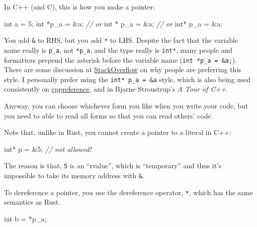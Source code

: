 \documentclass[
]{book}
\newenvironment{Shaded}{\begin{snugshade}}{\end{snugshade}}
\newcommand{\CommentTok}[1]{\textcolor[rgb]{0.56,0.35,0.01}{\textit{#1}}}
\newcommand{\DataTypeTok}[1]{\textcolor[rgb]{0.13,0.29,0.53}{#1}}
\newcommand{\DecValTok}[1]{\textcolor[rgb]{0.00,0.00,0.81}{#1}}
\newcommand{\NormalTok}[1]{#1}
\begin{document}
In C++ (and C), this is how you make a pointer:

\begin{Shaded}
\begin{Highlighting}[]
\DataTypeTok{int}\NormalTok{    a =  }\DecValTok{5}\NormalTok{;}
\DataTypeTok{int}\NormalTok{ *p\_a = \&a;}
\CommentTok{// or}
\DataTypeTok{int}\NormalTok{ * p\_a = \&a;}
\CommentTok{// or}
\DataTypeTok{int}\NormalTok{*  p\_a = \&a;}
\end{Highlighting}
\end{Shaded}

You add \texttt{\&} to RHS, but you add \texttt{*} to LHS. Despite the fact that the variable name really is \texttt{p\_a}, not \texttt{*p\_a}, and the type really is \texttt{int*}, many people and formatters prepend the asterisk before the variable name (\texttt{int\ *p\_a\ =\ \&a;}). There are some discussion at \href{https://stackoverflow.com/questions/398395/why-is-the-asterisk-before-the-variable-name-rather-than-after-the-type}{StackOverflow} on why people are preferring this style. I personally prefer using the \texttt{int*\ p\_a\ =\ \&a} style, which is also being used consistently on \href{https://en.cppreference.com/w/cpp/language/pointer}{cppreference}, and in Bjarne Stroustrup's \emph{A Tour of C++}.

Anyway, you can choose whichever form you like when you write your code, but you need to able to read all forms so that you can read others' code.

Note that, unlike in Rust, you cannot create a pointer to a literal in C++:

\begin{Shaded}
\begin{Highlighting}[]
\DataTypeTok{int}\NormalTok{* p = \&}\DecValTok{5}\NormalTok{; }\CommentTok{// not allowed!}
\end{Highlighting}
\end{Shaded}

The reason is that, \texttt{5} is an ``rvalue'', which is ``temporary'' and thus it's impossible to take its memory address with \texttt{\&}.

To dereference a pointer, you use the dereference operator, \texttt{*}, which has the same semantics as Rust.

\begin{Shaded}
\begin{Highlighting}[]
\DataTypeTok{int}\NormalTok{ b = *p\_a;}
\end{Highlighting}
\end{Shaded}
\end{document}
